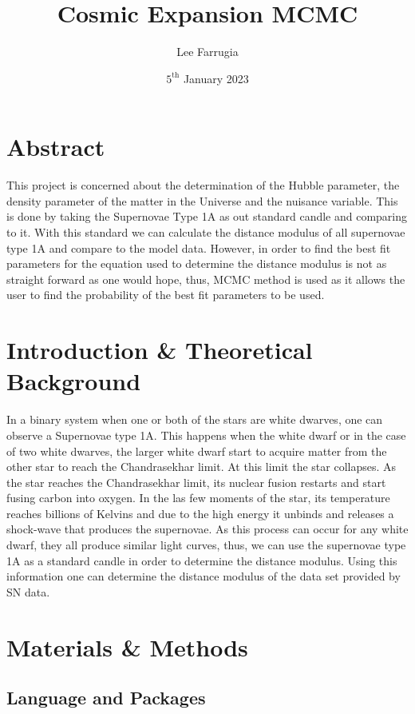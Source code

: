 \documentclass[12pt, a4paper]{article}
\title{Cosmic Expansion MCMC}
\date{\(5^\mathrm{{th}}\) January 2023}
\author{Lee Farrugia}
\begin{document}
    
\maketitle
\thispagestyle{titlepagestyle}
\pagestyle{mystyle}

\section{Abstract}

This project is concerned about the determination of the Hubble parameter, the density parameter of the matter in the Universe and the nuisance variable. This is done by taking the Supernovae Type 1A as out standard candle and comparing to it. With this standard we can calculate the distance modulus of all supernovae type 1A and compare to the model data. However, in order to find the best fit parameters for the equation used to determine the distance modulus is not as straight forward as one would hope, thus, MCMC method is used as it allows the user to find the probability of the best fit parameters to be used.

\section{Introduction \& Theoretical Background}

In a binary system when one or both of the stars are white dwarves, one can observe a Supernovae type 1A. This happens when the white dwarf or in the case of two white dwarves, the larger white dwarf start to acquire matter from the other star to reach the Chandrasekhar limit. At this limit the star collapses. As the star reaches the Chandrasekhar limit, its nuclear fusion restarts and start fusing carbon into oxygen. In the las few moments of the star, its temperature reaches billions of Kelvins and due to the high energy it unbinds and releases a shock-wave that produces the supernovae. As this process can occur for any white dwarf, they all produce similar light curves, thus, we can use the supernovae type 1A as a standard candle in order to determine the distance modulus. Using this information one can determine the distance modulus of the data set provided by SN data.

\section{Materials \& Methods}
    \subsection{Language and Packages}
\end{document}
